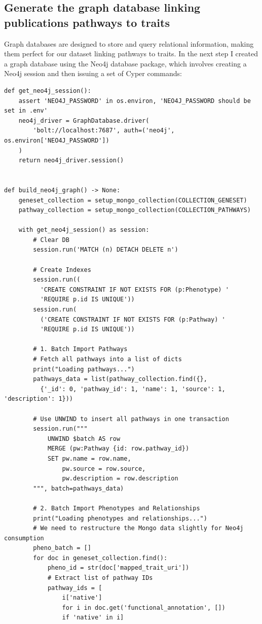 \subsection{Generate the graph database linking publications pathways to traits}

Graph databases are designed to store and query relational information, making them perfect for our dataset linking pathways to traits.  In the next step I created a graph database using the Neo4j database package, which involves creating a Neo4j session and then issuing a set of Cyper commands:

\begin{lstlisting}[style=Python]
def get_neo4j_session():
    assert 'NEO4J_PASSWORD' in os.environ, 'NEO4J_PASSWORD should be set in .env'
    neo4j_driver = GraphDatabase.driver(
        'bolt://localhost:7687', auth=('neo4j', os.environ['NEO4J_PASSWORD'])
    )
    return neo4j_driver.session()


def build_neo4j_graph() -> None:
    geneset_collection = setup_mongo_collection(COLLECTION_GENESET)
    pathway_collection = setup_mongo_collection(COLLECTION_PATHWAYS)

    with get_neo4j_session() as session:
        # Clear DB
        session.run('MATCH (n) DETACH DELETE n')
        
        # Create Indexes
        session.run((
          'CREATE CONSTRAINT IF NOT EXISTS FOR (p:Phenotype) '
          'REQUIRE p.id IS UNIQUE'))
        session.run(
          ('CREATE CONSTRAINT IF NOT EXISTS FOR (p:Pathway) '
          'REQUIRE p.id IS UNIQUE'))

        # 1. Batch Import Pathways
        # Fetch all pathways into a list of dicts
        print("Loading pathways...")
        pathways_data = list(pathway_collection.find({},
          {'_id': 0, 'pathway_id': 1, 'name': 1, 'source': 1, 'description': 1}))
        
        # Use UNWIND to insert all pathways in one transaction
        session.run("""
            UNWIND $batch AS row
            MERGE (pw:Pathway {id: row.pathway_id})
            SET pw.name = row.name,
                pw.source = row.source,
                pw.description = row.description
        """, batch=pathways_data)

        # 2. Batch Import Phenotypes and Relationships
        print("Loading phenotypes and relationships...")
        # We need to restructure the Mongo data slightly for Neo4j consumption
        pheno_batch = []
        for doc in geneset_collection.find():
            pheno_id = str(doc['mapped_trait_uri'])
            # Extract list of pathway IDs
            pathway_ids = [
                i['native'] 
                for i in doc.get('functional_annotation', []) 
                if 'native' in i]
             

\end{lstlisting}
